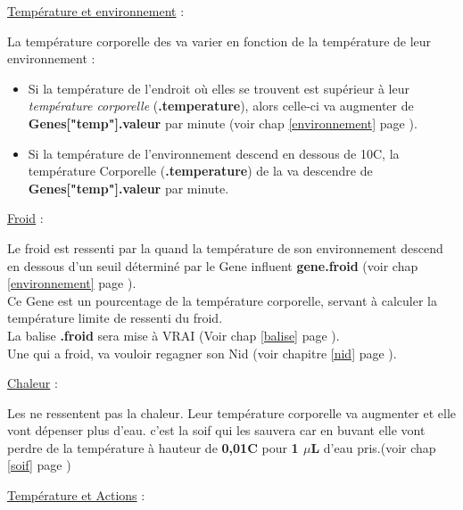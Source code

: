 \documentclass[french]{report}
\begin{document}
\begin{center}
	\underline{Température et environnement} :
\end{center}
 La température corporelle des \CoCiX va varier en fonction de la température de leur environnement :\\
\begin{itemize}
	\item Si la température de l'endroit où elles se trouvent est supérieur à leur \textit{température corporelle} (\textbf{.temperature}), alors celle-ci va augmenter de \textbf{Genes["temp"].valeur} par minute (voir chap \ref{environnement} page \pageref{environnement}).\\
	
	\item Si la température de l'environnement descend en dessous de 10\degres C, la température Corporelle (\textbf{.temperature}) de la \CoCiX va descendre de \textbf{Genes["temp"].valeur} par minute.
\end{itemize}

\begin{center}
	\underline{Froid} :\label{froid}
\end{center}
Le froid est ressenti par la \CoCiX quand la température de son environnement descend en dessous d'un seuil déterminé par le Gene influent \textbf{gene.froid} (voir chap \ref{environnement} page \pageref{environnement}).\\

Ce Gene est un pourcentage de la température corporelle, servant à calculer la température limite de ressenti du froid.\\
La balise \textbf{.froid} sera mise à VRAI (Voir chap \ref{balise} page \pageref{balise}).\\

Une \CoCiX qui a froid, va vouloir regagner son Nid (voir chapitre \ref{nid} page \pageref{nid}).


\begin{center}
	\underline{Chaleur} :\label{chaleur}
\end{center}
Les \CoCiX ne ressentent pas la chaleur. Leur température corporelle va augmenter et elle vont dépenser plus d'eau. c'est la soif qui les sauvera car en buvant elle vont perdre de la température à hauteur de \textbf{0,01\degres C}{ }pour \textbf{1 $ \mu$L} d'eau pris.(voir chap \ref{soif} page \pageref{soif})

\begin{center}
	\underline{Température et Actions} :
\end{center}
\end{document}

